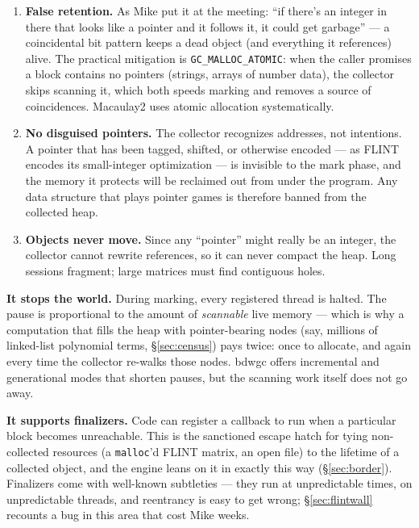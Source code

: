 \documentclass[11pt,oneside]{report}
\newcommand{\code}[1]{\textcolor{m2code}{\texttt{#1}}}
\begin{document}
\begin{enumerate}
\item \textbf{False retention.} As Mike put it at the meeting: ``if there's an
  integer in there that looks like a pointer and it follows it, it could get
  garbage'' --- a coincidental bit pattern keeps a dead object (and everything
  it references) alive. The practical mitigation is \code{GC\_MALLOC\_ATOMIC}:
  when the caller promises a block contains no pointers (strings, arrays of
  number data), the collector skips scanning it, which both speeds marking and
  removes a source of coincidences. Macaulay2 uses atomic allocation
  systematically.
\item \textbf{No disguised pointers.} The collector recognizes addresses, not
  intentions. A pointer that has been tagged, shifted, or otherwise encoded
  --- as FLINT encodes its small-integer optimization --- is invisible to the
  mark phase, and the memory it protects will be reclaimed out from under the
  program. Any data structure that plays pointer games is therefore banned
  from the collected heap.
\item \textbf{Objects never move.} Since any ``pointer'' might really be an
  integer, the collector cannot rewrite references, so it can never compact
  the heap. Long sessions fragment; large matrices must find contiguous holes.
\end{enumerate}

\textbf{It stops the world.} During marking, every registered thread is
halted. The pause is proportional to the amount of \emph{scannable} live
memory --- which is why a computation that fills the heap with
pointer-bearing nodes (say, millions of linked-list polynomial terms,
\S\ref{sec:census}) pays twice: once to allocate, and again every time the
collector re-walks those nodes. bdwgc offers incremental and generational
modes that shorten pauses, but the scanning work itself does not go away.

\textbf{It supports finalizers.} Code can register a callback to run when a
particular block becomes unreachable. This is the sanctioned escape hatch for
tying non-collected resources (a \code{malloc}'d FLINT matrix, an open file)
to the lifetime of a collected object, and the engine leans on it in exactly
this way (\S\ref{sec:border}). Finalizers come with well-known subtleties ---
they run at unpredictable times, on unpredictable threads, and reentrancy
is easy to get wrong; \S\ref{sec:flintwall} recounts a bug in this area that
cost Mike weeks.
\end{document}
